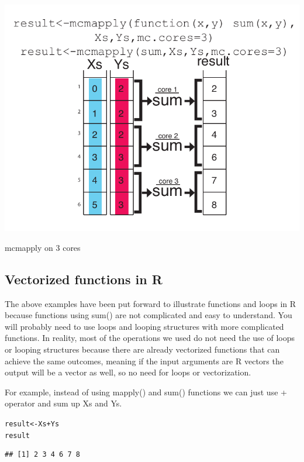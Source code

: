 \documentclass[english,nohyper]{tufte-book}\usepackage[]{graphicx}\usepackage[]{color}
\makeatletter
\newcommand{\hlopt}[1]{\textcolor[rgb]{0,0,0}{#1}}%
\newcommand{\hlstd}[1]{\textcolor[rgb]{0.345,0.345,0.345}{#1}}%
\newcommand{\hlkwb}[1]{\textcolor[rgb]{0.69,0.353,0.396}{#1}}%
\newenvironment{kframe}{%
 \def\at@end@of@kframe{}%
 \ifinner\ifhmode%
  \def\at@end@of@kframe{\end{minipage}}%
  \begin{minipage}{\columnwidth}%
 \fi\fi%
 \def\FrameCommand##1{\hskip\@totalleftmargin \hskip-\fboxsep
 \colorbox{shadecolor}{##1}\hskip-\fboxsep
     \hskip-\linewidth \hskip-\@totalleftmargin \hskip\columnwidth}%
 \MakeFramed {\advance\hsize-\width
   \@totalleftmargin\z@ \linewidth\hsize
   \@setminipage}}%
 {\par\unskip\endMakeFramed%
 \at@end@of@kframe}
\newenvironment{knitrout}{}{} %
\makeatother
\begin{document}
\begin{marginfigure}
\includegraphics[scale=0.5]{4_Users_altuna_Dropbox_PAPERS_R-devel_compgenr_chapters_nonR_figures_mcmapply.pdf}

\caption{mcmapply on 3 cores\label{mar:mcmapply-on-3}}
\end{marginfigure}



\subsection{Vectorized functions in R}

The above examples have been put forward to illustrate functions and
loops in R because functions using sum() are not complicated and easy
to understand. You will probably need to use loops and looping structures
with more complicated functions. In reality, most of the operations
we used do not need the use of loops or looping structures because
there are already vectorized functions that can achieve the same outcomes,
meaning if the input arguments are R vectors the output will be a
vector as well, so no need for loops or vectorization.

For example, instead of using mapply() and sum() functions we can
just use + operator and sum up Xs and Ys. 

\begin{knitrout}
\color{fgcolor}\begin{kframe}
\begin{alltt}
\hlstd{result} \hlkwb{<-} \hlstd{Xs} \hlopt{+} \hlstd{Ys}
\hlstd{result}
\end{alltt}
\begin{verbatim}
## [1] 2 3 4 6 7 8
\end{verbatim}
\end{kframe}
\end{knitrout}
\end{document}
